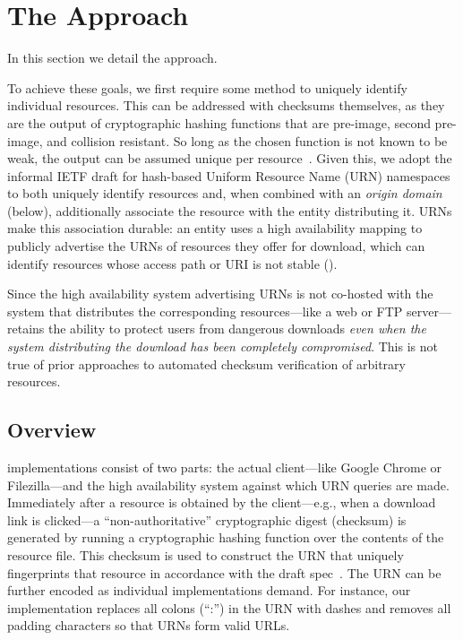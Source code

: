 \section{The \SYSTEM{} Approach} \label{sec:approach}

In this section we detail the \SYSTEM{} approach.

To achieve these goals, we first require some method to uniquely identify
individual resources. This can be addressed with checksums themselves, as they
are the output of cryptographic hashing functions that are pre-image, second
pre-image, and collision resistant. So long as the chosen function is not known
to be weak, the output can be assumed unique per resource~\cite{Rogaway}. Given
this, we adopt the informal IETF draft for hash-based Uniform Resource Name
(URN) namespaces~\cite{draft-URN} to both uniquely identify resources and, when
combined with an \emph{origin domain} (below), additionally associate the
resource with the entity distributing it. URNs make this association durable: an
entity uses a high availability mapping to publicly advertise the URNs of
resources they offer for download, which can identify resources whose access
path or URI is not stable ().

Since the high availability system advertising URNs is not co-hosted with the
system that distributes the corresponding resources---like a web or FTP
server---\SYSTEM{} retains the ability to protect users from dangerous downloads
\emph{even when the system distributing the download has been completely
compromised}. This is not true of prior approaches to automated checksum
verification of arbitrary resources. 

\subsection{Overview}

\SYSTEM{} implementations consist of two parts: the actual client---like Google
Chrome or Filezilla---and the high availability system against which URN queries
are made. Immediately after a resource is obtained by the client---e.g., when a
download link is clicked---a ``non-authoritative'' cryptographic digest
(checksum) is generated by running a cryptographic hashing function over the
contents of the resource file. This checksum is used to construct the URN that
uniquely fingerprints that resource in accordance with the draft
spec~\cite{draft-URN}. The URN can be further encoded as individual
implementations demand. For instance, our \DNSSYS{} implementation replaces all
colons (``:'') in the URN with dashes and removes all padding characters so that
URNs form valid URLs.

